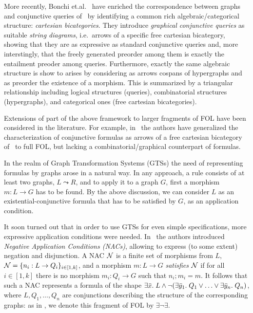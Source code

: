 More recently, Bonchi et.al.~\cite{DBLP:conf/csl/BonchiSS18} have enriched the correspondence between graphs and conjunctive queries of~\cite{DBLP:conf/stoc/ChandraM77} by identifying a common rich algebraic/categorical structure: \emph{cartesian bicategories}. They introduce \emph{graphical conjunctive queries} as suitable \emph{string diagrams}, i.e.~arrows of a specific free cartesian bicategory, showing that they are as expressive as standard conjunctive queries and, more interstingly, that the freely generated preorder among them is exactly the entailment preoder among queries. Furthermore, exactly the same algebraic structure is show to arises by considering as arrows cospans of hypergraphs and as preorder the existence of a morphism. This is summarized by a triangular relationship including logical structures (queries), combinatorial structures (hypergraphs), and categorical ones (free cartesian bicategories).     

Extensions of part of the above framework to larger fragments of FOL have been considered in the literature. For example, in~\cite{DBLP:journals/corr/abs-2404-18795} the authors have generalized the characterization of conjunctive formulas as arrows of a free cartesian bicategory of~\cite{DBLP:conf/csl/BonchiSS18} to full FOL, but lacking a combinatorial/graphical counterpart of formulas. 

In the realm of Graph Transformation Systems  (GTSs)
 the need of representing formulas by graphs arose in a natural way. 
 In any approach, a rule consists of at least two graphs, $L \leadsto R$, and to apply it to a graph $G$, first a morphism $m: L \to G$ has to be found. 
 By the above discussion, we can consider $L$ as an existential-conjunctive formula that has to be satisfied by $G$, as an application condition. 

It soon turned out that in order to use GTSs for even simple specifications, more expressive application conditions were needed. 
In~\cite{NegativeAC} the authors introduced \emph{Negative Application Conditions (NACs)}, allowing to express (to some extent) negation and disjunction.  A NAC $\mathcal{N}$ is  a finite set of morphisms from $L$, $\mathcal{N} = \{n_i: L \rightarrow Q_i\}_{i\in[1,k]}$, and a morphism $m: L \to G$ \emph{satisfies} $\mathcal{N}$ if for all $i\in[1,k]$ there is no morphism $m_i: Q_i \to G$ such that $n_i;m_i = m$. 
It follows that such a NAC represents a formula of the shape $\exists \bar{x}.\; L \wedge \neg (\exists \bar{y}_1.\; Q_1 \vee \ldots \vee \exists \bar{y}_n.\; Q_n)$, where $L, Q_1, \ldots,Q_n$ are conjunctions describing the structure of the corresponding graphs: as in \cite{Rensink-FOL}, we denote this fragment of FOL by $\exists \neg \exists$.

